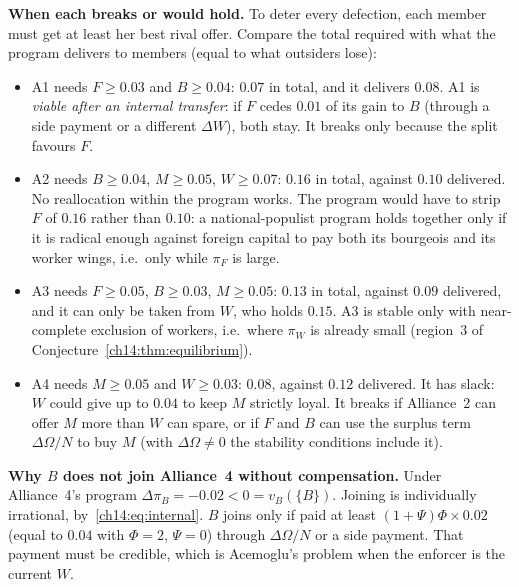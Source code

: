 \documentclass[../solutions_manual.tex]{subfiles}
\begin{document}
\textbf{When each breaks or would hold.} To deter every defection, each member must get at least her best rival offer. Compare the total required with what the program delivers to members (equal to what outsiders lose):
\begin{itemize}
\item A1 needs $F \ge 0.03$ and $B \ge 0.04$: $0.07$ in total, and it delivers $0.08$. A1 is \emph{viable after an internal transfer}: if $F$ cedes $0.01$ of its gain to $B$ (through a side payment or a different $\Delta W$), both stay. It breaks only because the split favours $F$.
\item A2 needs $B \ge 0.04$, $M \ge 0.05$, $W \ge 0.07$: $0.16$ in total, against $0.10$ delivered. No reallocation within the program works. The program would have to strip $F$ of $0.16$ rather than $0.10$: a national-populist program holds together only if it is radical enough against foreign capital to pay both its bourgeois and its worker wings, i.e.\ only while $\pi_F$ is large.
\item A3 needs $F \ge 0.05$, $B \ge 0.03$, $M \ge 0.05$: $0.13$ in total, against $0.09$ delivered, and it can only be taken from $W$, who holds $0.15$. A3 is stable only with near-complete exclusion of workers, i.e.\ where $\pi_W$ is already small (region~3 of Conjecture~\ref{ch14:thm:equilibrium}).
\item A4 needs $M \ge 0.05$ and $W \ge 0.03$: $0.08$, against $0.12$ delivered. It has slack: $W$ could give up to $0.04$ to keep $M$ strictly loyal. It breaks if Alliance~2 can offer $M$ more than $W$ can spare, or if $F$ and $B$ can use the surplus term $\Delta\Omega/N$ to buy $M$ (with $\Delta\Omega \neq 0$ the stability conditions include it).
\end{itemize}

\textbf{Why $B$ does not join Alliance~4 without compensation.} Under Alliance~4's program $\Delta\pi_B = -0.02 < 0 = v_B(\{B\})$. Joining is individually irrational, by~\eqref{ch14:eq:internal}. $B$ joins only if paid at least $(1+\Psi)\Phi\times 0.02$ (equal to $0.04$ with $\Phi = 2$, $\Psi = 0$) through $\Delta\Omega/N$ or a side payment. That payment must be credible, which is Acemoglu's problem when the enforcer is the current $W$.
\end{document}
